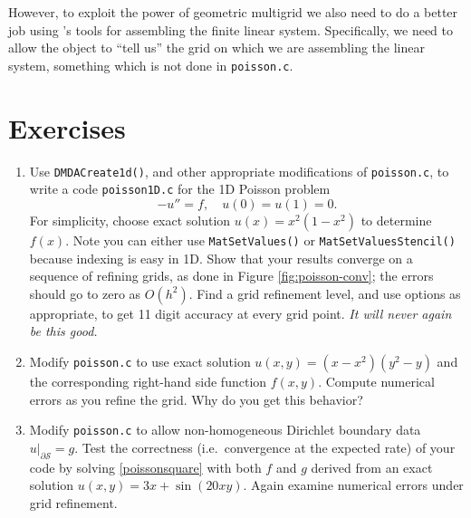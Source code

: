 However, to exploit the power of geometric multigrid we also need to do a better job using \PETSc's tools for assembling the finite linear system.  Specifically, we need to allow the \pDMDA object to ``tell us'' the grid on which we are assembling the linear system, something which is not done in \texttt{poisson.c}.


\section{Exercises}

\renewcommand{\labelenumi}{\arabic{chapter}.\arabic{enumi}\quad}

\begin{enumerate}

\item Use \texttt{DMDACreate1d()}, and other appropriate modifications of \texttt{poisson.c}, to write a code \texttt{poisson1D.c} for the 1D Poisson problem
    $$-u'' = f, \quad u(0)=u(1)=0.$$
For simplicity, choose exact solution $u(x)=x^2(1-x^2)$ to determine $f(x)$.  Note you can either use \texttt{MatSetValues()} or \texttt{MatSetValuesStencil()} because indexing is easy in 1D.  Show that your results converge on a sequence of refining grids, as done in Figure \ref{fig:poisson-conv}; the errors should go to zero as $O(h^2)$.  Find a grid refinement level, and use \pKSP options as appropriate, to get 11 digit accuracy at every grid point.  \emph{It will never again be this good.}

\item \label{exer:st:quadraticnongeneric}  Modify \texttt{poisson.c} to use exact solution $u(x,y)=(x-x^2)(y^2-y)$ and the corresponding right-hand side function $f(x,y)$.  Compute numerical errors as you refine the grid.  Why do you get this behavior?

\item Modify \texttt{poisson.c} to allow non-homogeneous Dirichlet boundary data $u|_{\partial \mathcal{S}}=g$.  Test the correctness (i.e.~convergence at the expected rate) of your code by solving \eqref{poissonsquare} with both $f$ and $g$ derived from an exact solution $u(x,y)=3x + \sin(20xy)$.  Again examine  numerical errors under grid refinement.


\end{enumerate}
